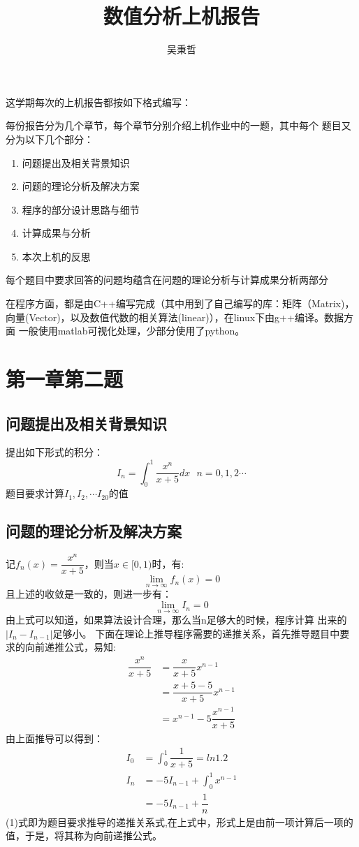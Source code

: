 \documentclass[10pt,a4paper]{ctexart}
\author{吴秉哲}
\title{数值分析上机报告}
\begin{document}
\maketitle
这学期每次的上机报告都按如下格式编写：

每份报告分为几个章节，每个章节分别介绍上机作业中的一题，其中每个
题目又分为以下几个部分：
\begin{enumerate}
\item 问题提出及相关背景知识
\item 问题的理论分析及解决方案
\item 程序的部分设计思路与细节
\item 计算成果与分析
\item 本次上机的反思
\end{enumerate}
每个题目中要求回答的问题均蕴含在问题的理论分析与计算成果分析两部分

在程序方面，都是由C++编写完成（其中用到了自己编写的库：矩阵（Matrix)，向量(Vector)，以及数值代数的相关算法(linear)），在linux下由g++编译。数据方面
一般使用matlab可视化处理，少部分使用了python。
\section{第一章第二题}
\subsection{问题提出及相关背景知识}
提出如下形式的积分：
\[I_n=\int_{0}^{1}\dfrac{x^n}{x+5}dx \ \ \ n=0,1,2\cdots \]
题目要求计算$I_1,I_2,\cdots I_{20}$的值
\subsection{问题的理论分析及解决方案}
记$f_n(x)=\dfrac{x^n}{x+5}$，则当$x\in [0,1)$时，有:\[\lim_{n\rightarrow \infty}f_n(x)=0\]
且上述的收敛是一致的，则进一步有：
\[\lim_{n\rightarrow \infty}I_n=0\]
由上式可以知道，如果算法设计合理，那么当n足够大的时候，程序计算
出来的$\left|I_n-I_{n-1}\right|$足够小。
下面在理论上推导程序需要的递推关系，首先推导题目中要求的向前递推公式，易知:
\begin{equation*}
\begin{split}
\dfrac{x^n}{x+5}&=\dfrac{x}{x+5}x^{n-1}\\
& =\dfrac{x+5-5}{x+5}x^{n-1}\\
& =x^{n-1}-5\dfrac{x^{n-1}}{x+5}
\end{split}
\end{equation*}
由上面推导可以得到：
\begin{equation}
\begin{split}
I_0&=\int_{0}^{1}\dfrac{1}{x+5}=ln1.2\\
I_n&=-5I_{n-1}+\int_{0}^{1}x^{n-1}\\
& =-5I_{n-1}+\dfrac{1}{n}
\end{split}
\end{equation}
(1)式即为题目要求推导的递推关系式,在上式中，形式上是由前一项计算后一项的值，于是，将其称为向前递推公式。
\end{document}
